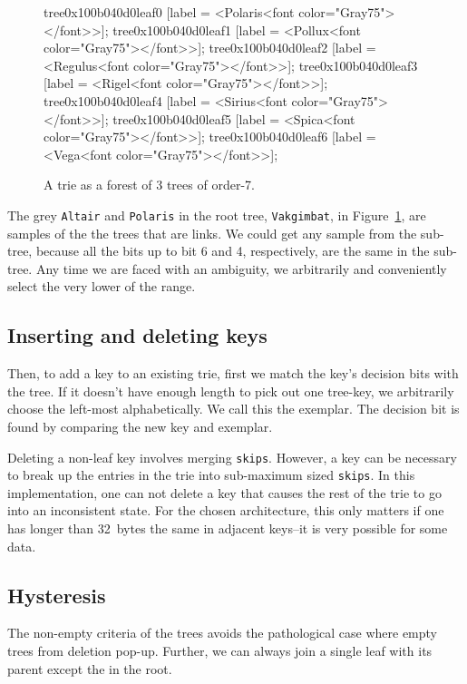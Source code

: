 \documentclass[12pt]{article}
\newcommand{\code}[1]{\colorbox{light-gray}{\texttt{#1}}}
\begin{document}
\begin{figure}
{{	tree0x100b040d0leaf0 [label = <Polaris<font color="Gray75"></font>>];
	tree0x100b040d0leaf1 [label = <Pollux<font color="Gray75"></font>>];
	tree0x100b040d0leaf2 [label = <Regulus<font color="Gray75"></font>>];
	tree0x100b040d0leaf3 [label = <Rigel<font color="Gray75"></font>>];
	tree0x100b040d0leaf4 [label = <Sirius<font color="Gray75"></font>>];
	tree0x100b040d0leaf5 [label = <Spica<font color="Gray75"></font>>];
	tree0x100b040d0leaf6 [label = <Vega<font color="Gray75"></font>>];
}
	}
	\caption{A trie as a forest of 3 trees of order-7.\label{star-1}}
\end{figure}

The grey \code{Altair} and \code{Polaris} in the root tree, \code{Vakgimbat}, in Figure~\ref{star-1}, are samples of the the trees that are links. We could get any sample from the sub-tree, because all the bits up to bit 6 and 4, respectively, are the same in the sub-tree. Any time we are faced with an ambiguity, we arbitrarily and conveniently select the very lower of the range.

\subsection{Inserting and deleting keys}

Then, to add a key to an existing trie, first we match the key's decision bits with the tree. If it doesn't have enough length to pick out one tree-key, we arbitrarily choose the left-most alphabetically. We call this the exemplar. The decision bit is found by comparing the new key and exemplar.

Deleting a non-leaf key involves merging \code{skips}. However, a key can be necessary to break up the entries in the trie into sub-maximum sized \code{skips}. In this implementation, one can not delete a key that causes the rest of the trie to go into an inconsistent state. For the chosen architecture, this only matters if one has longer than 32~bytes the same in adjacent keys–it is very possible for some data.

\subsection{Hysteresis}

The non-empty criteria of the trees avoids the pathological case where empty trees from deletion pop-up. Further, we can always join a single leaf with its parent except the in the root.
\end{document}
